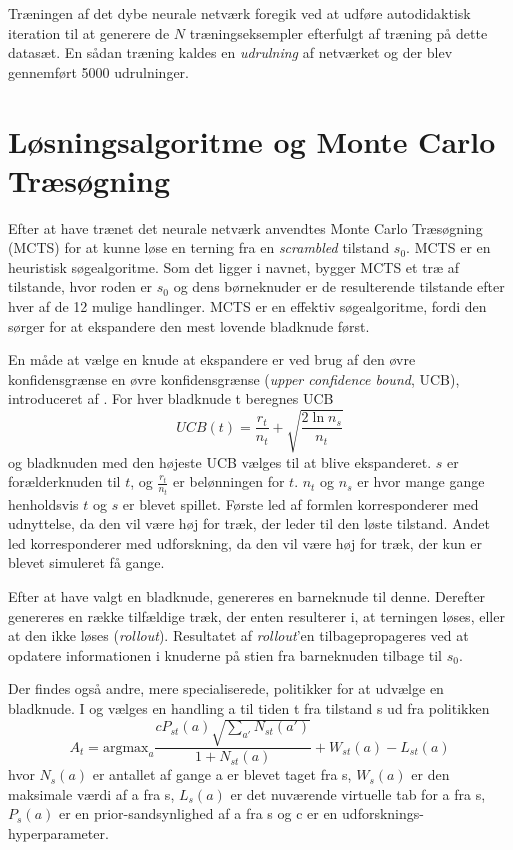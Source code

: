 \documentclass[../main.tex]{subfiles}
\begin{document}
Træningen af det dybe neurale netværk foregik ved at udføre autodidaktisk iteration til at generere de \(N\) træningseksempler efterfulgt af træning på dette datasæt. 
En sådan træning kaldes en \textit{udrulning} af netværket og der blev gennemført 5000 udrulninger.
\section{Løsningsalgoritme og Monte Carlo Træsøgning}
Efter at have trænet det neurale netværk anvendtes Monte Carlo Træsøgning (MCTS) for at kunne løse en terning fra en \emph{scrambled} tilstand $s_0$. MCTS er en heuristisk søgealgoritme. Som det ligger i navnet, bygger MCTS et træ af tilstande, hvor roden er $s_0$ og dens børneknuder er de resulterende tilstande efter hver af de 12 mulige handlinger. MCTS er en effektiv søgealgoritme, fordi den sørger for at ekspandere den mest lovende bladknude først. 

En måde at vælge en knude at ekspandere er ved brug af den øvre konfidensgrænse en øvre konfidensgrænse (\emph{upper confidence bound}, UCB), introduceret af \cite{Kocsis06banditbased}. For hver bladknude t beregnes UCB
$$UCB(t)=\frac{r_t}{n_t}+\sqrt{\frac{2\ln n_s}{n_t}}$$
og bladknuden med den højeste UCB vælges til at blive ekspanderet. $s$ er forælderknuden til $t$, og $\frac{r_t}{n_t}$ er belønningen for $t$. $n_t$ og $n_s$ er hvor mange gange henholdsvis $t$ og $s$ er blevet spillet. Første led af formlen korresponderer med udnyttelse, da den vil være høj for træk, der leder til den løste tilstand. Andet led korresponderer med udforskning, da den vil være høj for træk, der kun er blevet simuleret få gange. 

Efter at have valgt en bladknude, genereres en barneknude til denne. Derefter genereres en række tilfældige træk, der enten resulterer i, at terningen løses, eller at den ikke løses (\emph{rollout}). Resultatet af \emph{rollout}'en tilbagepropageres ved at opdatere informationen i knuderne på stien fra barneknuden tilbage til $s_0$. 

Der findes også andre, mere specialiserede, politikker for at udvælge en bladknude. I \cite{HumansBeGone} og \cite{mcaleer2018solving} vælges en handling a til tiden t fra tilstand s ud fra politikken
$$A_t=\text{argmax}_a\frac{cP_{st}(a)\sqrt{\sum_{a'}N_{st}(a')}}{1+N_{st}(a)} + W_{st}(a) - L_{st}(a)$$
hvor $N_s(a)$ er antallet af gange a er blevet taget fra s, $W_s(a)$ er den maksimale værdi af a fra s, $L_s(a)$ er det nuværende virtuelle tab for a fra s, $P_s(a)$ er en prior-sandsynlighed af a fra s og c er en udforsknings-hyperparameter. 
  
\end{document}
